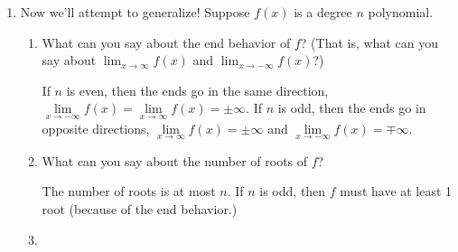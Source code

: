 \documentclass{article}
\begin{document}
\begin{enumerate}[resume, topsep=0pt]
\begin{enumerate}
    \begin{solution}
      No, not every cubic can be graphed by shifting and stretching
      $y=x^3$. The graph of any shift and stretch of $y=x^3$ will
      only ever have one $x$-intercept, but there are cubics
      that have 2 and 3 $x$-intercepts.
    \end{solution}

  \end{enumerate}

\item  Now we'll attempt to generalize! Suppose $f(x)$ is a degree $n$ polynomial.
  \begin{enumerate}

  \item
    \begin{problem}[\vfill]
      What can you say about the end behavior of $f$? (That is, what can you say about $\displaystyle \lim_{x \to \infty} f(x)$ and $\displaystyle \lim_{x \to -\infty} f(x)$?)
    \end{problem}

    \begin{solution}
      If $n$ is even, then the ends go in the same direction,
       $\lim\limits_{x\to-\infty} f(x) = \lim\limits_{x \to \infty} f(x)=
      \pm \infty$. If $n$ is odd, then the ends go in opposite directions,
      $\lim\limits_{x\to\infty} f(x)
      = \pm \infty$ and $\lim\limits_{x\to-\infty} f(x) = \mp \infty$.
      
      
    \end{solution}

  \item


    \begin{problem}[\vfill]
      What can you say about the number of roots of $f$?
    \end{problem}

    \begin{solution}
      The number of roots is at most $n$. If $n$ is odd, then
      $f$ must have at least 1 root (because of the end behavior.)
    \end{solution}

  \item



\end{enumerate}
\end{enumerate}
\end{document}
